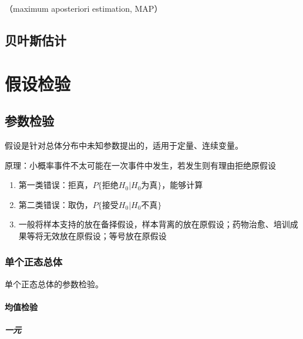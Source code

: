 \documentclass[12pt]{book}
\begin{document}
（maximum aposteriori estimation, MAP）



\section{贝叶斯估计}


\chapter{假设检验}





\section{参数检验}



假设是针对总体分布中未知参数提出的，适用于定量、连续变量。

原理：小概率事件不太可能在一次事件中发生，若发生则有理由拒绝原假设
\begin{enumerate}[(1)]
    \item 第一类错误：拒真，$P\{拒绝H_0|H_0为真\}$，能够计算
    \item 第二类错误：取伪，$P\{接受H_0|H_0不真\}$
    \item 一般将样本支持的放在备择假设，样本背离的放在原假设；药物治愈、培训成果等将无效放在原假设；等号放在原假设
\end{enumerate}






\subsection{单个正态总体}





单个正态总体的参数检验。


\subsubsection{均值检验}

\paragraph{一元}
\end{document}
